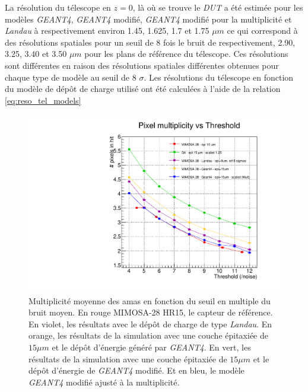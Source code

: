    \medskip
   
   La r\'esolution du télescope en $z=0$, l\`a o\`u se trouve le \textit{DUT} a \'et\'e estim\'ee pour les mod\`eles \textit{GEANT4}, \textit{GEANT4} modifi\'e, \textit{GEANT4} modifi\'e pour la multiplicit\'e et \textit{Landau} \`a respectivement environ 1.45, 1.625, 1.7 et 1.75 $\mu m$ ce qui correspond \`a des r\'esolutions spatiales pour un seuil de 8 fois le bruit de respectivement, 2.90, 3.25, 3.40 et 3.50 $\mu m$ pour les plans de r\'ef\'erence du t\'elescope. Ces r\'esolutions sont diff\'erentes en raison des r\'esolutions spatiales diff\'erentes obtenues pour chaque type de mod\`ele au seuil de 8 $\sigma$. Les r\'esolutions du t\'elescope en fonction du mod\`ele de d\'epôt de charge utilis\'e ont \'et\'e calcul\'ees \`a l'aide de la relation \ref{eq:reso_tel_models}
   
   \medskip
   
   \begin{figure}[!htb]
    \begin{center} 
     \includegraphics[scale=0.52]{./figures/Plots_resultat_simu/G4_landau_mult_oct.pdf}
     \caption{Multiplicit\'e moyenne des amas en fonction du seuil en multiple du bruit moyen. En rouge MIMOSA-28 HR15, le capteur de r\'ef\'erence. En violet, les r\'esultats avec le d\'epôt de charge de type \textit{Landau}. En orange, les r\'esultats de la simulation avec une couche épitaxiée de $15 \mu m$ et le d\'ep\^ot d'\'energie g\'en\'er\'e par \textit{GEANT4}. En vert, les r\'esultats de la simulation avec une couche épitaxiée de $15 \mu m$ et le d\'ep\^ot d'\'energie de \textit{GEANT4} modifi\'e. Et en bleu, le mod\`ele \textit{GEANT4} modifi\'e ajust\'e \`a la multiplicit\'e.}
    \label{fig:multiplicity}
    \end{center}
   \end{figure}
   
